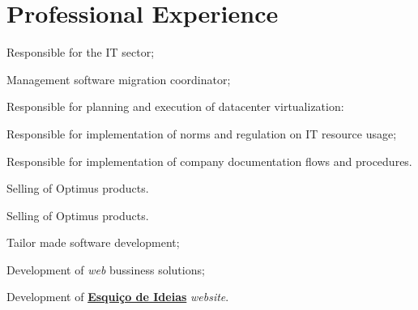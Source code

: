 \documentclass[letterpaper]{deedy-resume} %
\begin{document}
\begin{minipage}[t]{0.66\textwidth}

\section{Professional Experience}


\vspace{\topsep}
\begin{tightitemize}
	\item Responsible for the IT sector;
	\item Management software migration coordinator;
	\item Responsible for planning and execution of datacenter virtualization:
	\item Responsible for implementation of norms and regulation on IT resource usage;
	\item Responsible for implementation of company documentation flows and procedures.
\end{tightitemize}

\sectionspace


\begin{tightitemize}
	\item Selling of Optimus products.
\end{tightitemize}

\sectionspace


\begin{tightitemize}
	\item Selling of Optimus products.
\end{tightitemize}

\sectionspace


\begin{tightitemize}
	\item Tailor made software development;
	\item Development of \textit{web} bussiness solutions;
	\item Development of \href{http://esquicodeideias.com}{\textbf{Esquiço de Ideias}} \textit{website}.
\end{tightitemize}


\end{minipage}
\end{document}
